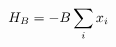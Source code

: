 \documentclass[preview]{standalone}
\begin{document}
\begin{align*}
\special{dvisvgm:raw <g id='unique000'>}H_B = -B \sum_i x_i\special{dvisvgm:raw </g>}
\end{align*}
\end{document}
